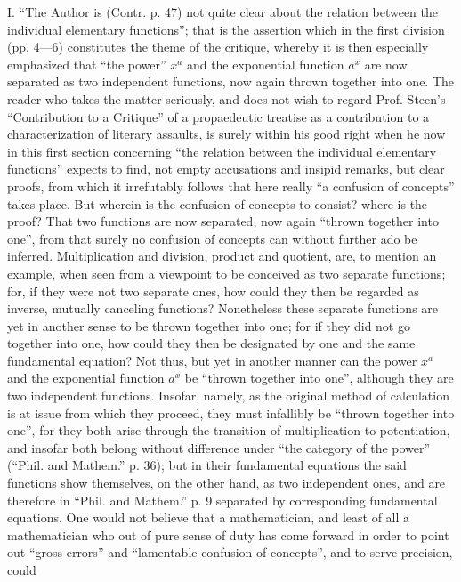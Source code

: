 \documentclass[12pt,a4paper,openany]{book}
\newcommand{\opage}[1]{\marginnote{\footnotesize\textit{[#1]}}}
\begin{document}
I. ``The Author is (Contr. p. 47) not quite clear about
the relation between the individual elementary functions''; that is the assertion which in the first division (pp. 4---6)
constitutes the theme of the critique, whereby it is then especially emphasized that
``the power'' $x^{a}$ and the exponential function $a^{x}$ are now separated as two independent functions, now again thrown
together into one. The reader who takes the matter seriously,
and does not wish to regard Prof. Steen's ``Contribution to a
Critique'' of a propaedeutic treatise as a contribution to a
characterization of literary assaults, is surely within his good
right when he now in this first section concerning ``the relation
between the individual elementary functions'' expects to find,
not empty accusations and insipid remarks, but clear
proofs, from which it irrefutably follows that here really
``a confusion of concepts'' takes place. But wherein is
the confusion of concepts to consist? where is the proof? That two functions are now separated, now again ``thrown together into one'',
from that surely no confusion of concepts can without further ado be inferred. Multiplication and division, product and quotient,
are, to mention an example, when seen from a
\opage{19}\setcounter{footnote}{0}%
viewpoint to be conceived as two separate functions; for, if they
were not two separate ones, how could they then be regarded as
inverse, mutually canceling functions? Nonetheless
these separate functions are yet in another sense to be thrown together into one; for if they did not go together
into one, how could they then be designated by one and the same
fundamental equation? Not thus, but yet in another
manner can the power $x^{a}$ and the exponential function $a^{x}$
be ``thrown together into one'', although they are two independent functions. Insofar, namely, as the original
method of calculation is at issue from which they proceed, they must infallibly be ``thrown
together into one'', for they both arise through the transition of multiplication to potentiation, and insofar both belong
without difference under ``the category of the power'' (``Phil. and Mathem.''
p. 36); but in their fundamental equations the said
functions show themselves, on the other hand, as two independent ones, and are therefore
in ``Phil. and Mathem.'' p. 9 separated by corresponding
fundamental equations. One would not believe that a mathematician, and least of all a mathematician who out of pure
sense of duty has come forward in order to point out ``gross errors'' and
``lamentable confusion of concepts'', and to serve precision, could
\end{document}
